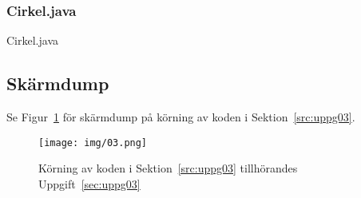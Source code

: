 \subsubsection{Cirkel.java}
\caption{Cirkel.java}
\label{src:cirkel}


\subsection{Skärmdump}
Se Figur~\ref{fig:uppg03-screenshot} för skärmdump på körning av koden i
Sektion~\ref{src:uppg03}.

\begin{figure}[htbp]
    \centering
        \texttt{[image: img/03.png]}
        \caption{Körning av koden i Sektion~\ref{src:uppg03} tillhörandes Uppgift~\ref{sec:uppg03}}
    \label{fig:uppg03-screenshot}
\end{figure}

